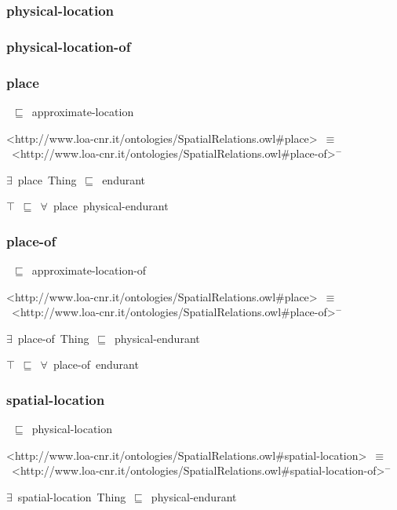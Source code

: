 \documentclass{article}
\begin{document}
\subsubsection*{physical-location}

\subsubsection*{physical-location-of}

\subsubsection*{place}

~\ensuremath{\sqsubseteq}~approximate-location

<http://www.loa-cnr.it/ontologies/SpatialRelations.owl#place>~\ensuremath{\equiv}~<http://www.loa-cnr.it/ontologies/SpatialRelations.owl#place-of>\ensuremath{^-}

\ensuremath{\exists}~place~Thing~\ensuremath{\sqsubseteq}~endurant

\ensuremath{\top}~\ensuremath{\sqsubseteq}~\ensuremath{\forall}~place~physical-endurant

\subsubsection*{place-of}

~\ensuremath{\sqsubseteq}~approximate-location-of

<http://www.loa-cnr.it/ontologies/SpatialRelations.owl#place>~\ensuremath{\equiv}~<http://www.loa-cnr.it/ontologies/SpatialRelations.owl#place-of>\ensuremath{^-}

\ensuremath{\exists}~place-of~Thing~\ensuremath{\sqsubseteq}~physical-endurant

\ensuremath{\top}~\ensuremath{\sqsubseteq}~\ensuremath{\forall}~place-of~endurant

\subsubsection*{spatial-location}

~\ensuremath{\sqsubseteq}~physical-location

<http://www.loa-cnr.it/ontologies/SpatialRelations.owl#spatial-location>~\ensuremath{\equiv}~<http://www.loa-cnr.it/ontologies/SpatialRelations.owl#spatial-location-of>\ensuremath{^-}

\ensuremath{\exists}~spatial-location~Thing~\ensuremath{\sqsubseteq}~physical-endurant
\end{document}
